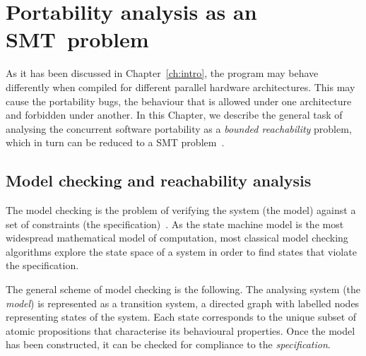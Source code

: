 \chapter{Portability analysis as an SMT~problem}
\label{ch:enc}







As it has been discussed in Chapter~\ref{ch:intro}, the program may behave differently when compiled for different parallel hardware architectures.
This may cause the portability bugs, the behaviour that is allowed under one architecture and forbidden under another. 
In this Chapter, we describe the general task of analysing the concurrent software portability
as a \textit{bounded reachability} problem, which in turn can be reduced to a SMT problem~\cite{Porthos17a}.


\section{Model checking and reachability analysis}
\label{ch:enc:mc}

The model checking is the problem of verifying the system (the model) against a set of constraints (the specification)~\cite{dkw2008}.
As the state machine model is the most widespread mathematical model of computation, most classical model checking algorithms explore the state space of a system in order to find states that violate the specification.

The general scheme of model checking is the following. 
The analysing system (the \textit{model}) is represented as a transition system, a directed graph with labelled nodes representing states of the system.
Each state corresponds to the unique subset of atomic propositions that characterise its behavioural properties.
Once the model has been constructed, it can be checked for compliance to the \textit{specification}.

